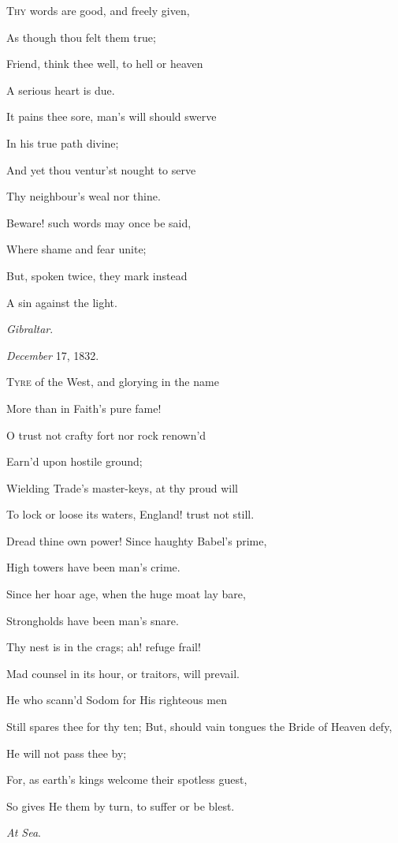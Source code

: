 T\textsc{hy} words are good, and freely given,

As though thou felt
them true;

Friend, think thee well, to hell or heaven

A serious heart is
due.

It pains thee sore, man's will should swerve

In his true path
divine;

And yet thou ventur'st nought to serve

Thy neighbour's
weal nor thine.

Beware! such words may once be said,

Where shame and
fear unite;

But, spoken twice, they mark instead

A sin against the
light.

\emph{Gibraltar}.

\emph{December} 17, 1832.


T\textsc{yre} of the West, and glorying in the name

More than in Faith's pure fame!

O trust not crafty fort nor rock renown'd

Earn'd upon hostile ground;

Wielding Trade's master-keys, at thy proud will

To lock or loose its waters, England! trust not still.

Dread thine own power! Since haughty Babel's prime,

High towers have been man's crime.

Since her hoar age, when the huge moat lay bare,

Strongholds have been man's snare.

Thy nest is in the crags; ah! refuge frail!

Mad counsel in its hour, or traitors, will prevail.

He who scann'd Sodom for His righteous men

Still spares thee for thy ten; But, should vain tongues the Bride of Heaven defy,

He will not pass thee by;

For, as earth's kings welcome their spotless guest,

So gives He them by turn, to suffer or be blest.

\emph{At Sea}.

